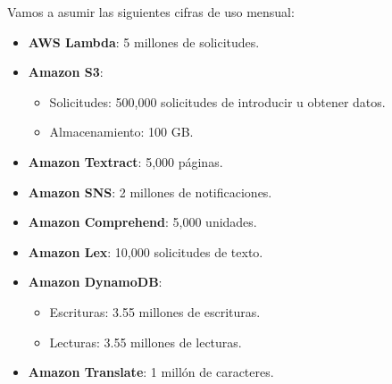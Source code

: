 \begin{enumerate}
\begin{enumerate}
				Vamos a asumir las siguientes cifras de uso mensual:

				\begin{itemize}
					\item \textbf{AWS Lambda}: 5 millones de solicitudes.

					\item \textbf{Amazon S3}:
						\begin{itemize}
							\item Solicitudes: 500,000 solicitudes de introducir u obtener
								datos.

							\item Almacenamiento: 100 GB.
						\end{itemize}

					\item \textbf{Amazon Textract}: 5,000 páginas.

					\item \textbf{Amazon SNS}: 2 millones de notificaciones.

					\item \textbf{Amazon Comprehend}: 5,000 unidades.

					\item \textbf{Amazon Lex}: 10,000 solicitudes de texto.

					\item \textbf{Amazon DynamoDB}:
						\begin{itemize}
							\item Escrituras: 3.55 millones de escrituras.

							\item Lecturas: 3.55 millones de lecturas.
						\end{itemize}

					\item \textbf{Amazon Translate}: 1 millón de caracteres.
				\end{itemize}


\end{enumerate}
\end{enumerate}
